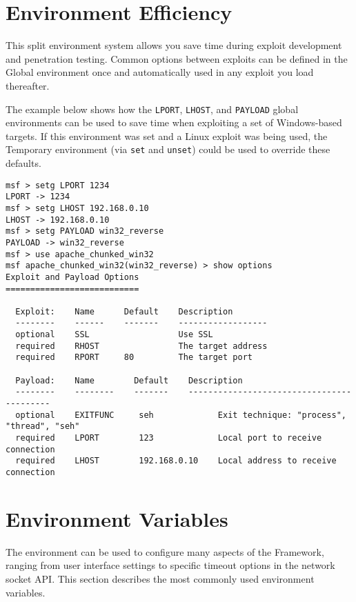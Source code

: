 \documentclass{report}
\begin{document}
    \section{Environment Efficiency}
    \label{ENV-EFF}
\par
This split environment system allows you save time during exploit development
and penetration testing. Common options between exploits can be defined in the
Global environment once and automatically used in any exploit you load thereafter.  

\par
The example below shows how the \texttt{LPORT}, \texttt{LHOST}, and
\texttt{PAYLOAD} global environments can be used to save time when exploiting a
set of Windows-based targets. If this environment was set and a Linux exploit
was being used, the Temporary environment (via \texttt{set} and \texttt{unset})
could be used to override these defaults.  

\begin{verbatim}
msf > setg LPORT 1234
LPORT -> 1234
msf > setg LHOST 192.168.0.10 
LHOST -> 192.168.0.10
msf > setg PAYLOAD win32_reverse
PAYLOAD -> win32_reverse
msf > use apache_chunked_win32 
msf apache_chunked_win32(win32_reverse) > show options 
Exploit and Payload Options
===========================

  Exploit:    Name      Default    Description
  --------    ------    -------    ------------------    
  optional    SSL                  Use SSL
  required    RHOST                The target address
  required    RPORT     80         The target port
  
  Payload:    Name        Default    Description
  --------    --------    -------    ------------------------------------------    
  optional    EXITFUNC     seh             Exit technique: "process", "thread", "seh"
  required    LPORT        123             Local port to receive connection
  required    LHOST        192.168.0.10    Local address to receive connection
\end{verbatim}


    \section{Environment Variables}
    \label{ENV-VAR}
\par
The environment can be used to configure many aspects of the Framework, ranging
from user interface settings to specific timeout options in the network socket
API. This section describes the most commonly used environment variables.  
\end{document}
